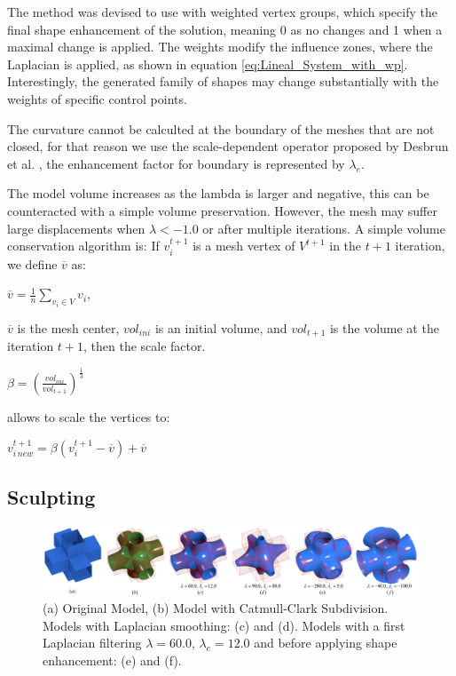 \documentclass[10pt, conference]{IEEEtran}
\begin{document}
The method was devised to use with weighted vertex groups, which specify
the final shape enhancement of the solution, meaning $0$ as no changes
and 1 when a maximal change is applied. The weights modify the influence
zones, where the Laplacian is applied, as shown in equation \ref{eq:Lineal_System_with_wp}.
Interestingly, the generated family of shapes may change substantially
with the weights of specific control points.

The curvature cannot be calculted at the boundary of the meshes that
are not closed, for that reason we use the scale-dependent operator
proposed by Desbrun et al. \cite{Desbrun1999}, the enhancement factor
for boundary is represented by $\lambda_{e}$.

The model volume increases as the lambda is larger and negative, this
can be counteracted with a simple volume preservation. However, the
mesh may suffer large displacements when $\lambda<-1.0$ or after
multiple iterations. A simple volume conservation algorithm is: If
$v_{i}^{t+1}$ is a mesh vertex of $V^{t+1}$ in the $t+1$ iteration,
we define $\overline{v}$ as:

\begin{center}
$\overline{v}=\frac{1}{n}\underset{v_{i}\in V}{\sum}v_{i}$, 
\par\end{center}

$\overline{v}$ is the mesh center, $vol_{ini}$ is an initial volume,
and $vol_{t+1}$ is the volume at the iteration $t+1$, then the scale
factor.

\begin{center}
$\beta=\left(\frac{vol_{ini}}{vol_{t+1}}\right)^{\frac{1}{3}}$
\par\end{center}

allows to scale the vertices to:

\begin{center}
$v_{i\, new}^{t+1}=\beta\left(v_{i}^{t+1}-\overline{v}\right)+\overline{v}$
\par\end{center}


\subsection{Sculpting\label{sub:Sculpting}}

\begin{figure}[t]
\includegraphics[width=1\textwidth]{figs/cruz_lambda4}

\caption{\label{fig:Catmull_Clark}(a) Original Model, (b) Model with Catmull-Clark
Subdivision. Models with Laplacian smoothing: (c) and (d). Models
with a first Laplacian filtering $\lambda=60.0$, $\lambda_{e}=12.0$
and before applying shape enhancement: (e) and (f).}
\end{figure}
\end{document}
